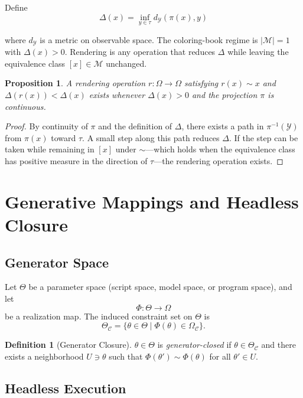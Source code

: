 \documentclass[12pt, twoside]{article}
\theoremstyle{plain}
\newtheorem{proposition}[theorem]{Proposition}
\theoremstyle{definition}
\newtheorem{definition}[theorem]{Definition}
\theoremstyle{remark}
\newcommand{\OmC}{\Omega_{\mathcal{C}}}
\begin{document}
Define
\[
\Delta(x) = \inf_{y \in \tau} d_{\mathcal{Y}}(\pi(x), y)
\]

where $d_{\mathcal{Y}}$ is a metric on observable space. The coloring-book regime is $|\mathcal{M}| = 1$ with $\Delta(x) > 0$. Rendering is any operation that reduces $\Delta$ while leaving the equivalence class $[x] \in \mathcal{M}$ unchanged.

\begin{proposition}
A rendering operation $r : \Omega \to \Omega$ satisfying $r(x) \sim x$ and $\Delta(r(x)) < \Delta(x)$ exists whenever $\Delta(x) > 0$ and the projection $\pi$ is continuous.
\end{proposition}

\begin{proof}
By continuity of $\pi$ and the definition of $\Delta$, there exists a path in $\pi^{-1}(\mathcal{Y})$ from $\pi(x)$ toward $\tau$. A small step along this path reduces $\Delta$. If the step can be taken while remaining in $[x]$ under $\sim$---which holds when the equivalence class has positive measure in the direction of $\tau$---the rendering operation exists.
\end{proof}

\section{Generative Mappings and Headless Closure}
\label{app:generator}

\subsection{Generator Space}

Let $\Theta$ be a parameter space (script space, model space, or program space), and let
\[
\Phi : \Theta \to \Omega
\]
be a realization map. The induced constraint set on $\Theta$ is
\[
\Theta_{\mathcal{C}} = \{ \theta \in \Theta \mid \Phi(\theta) \in \OmC \}.
\]

\begin{definition}[Generator Closure]
$\theta \in \Theta$ is \emph{generator-closed} if $\theta \in \Theta_{\mathcal{C}}$ and there exists a neighborhood $U \ni \theta$ such that $\Phi(\theta') \sim \Phi(\theta)$ for all $\theta' \in U$.
\end{definition}

\subsection{Headless Execution}
\end{document}

